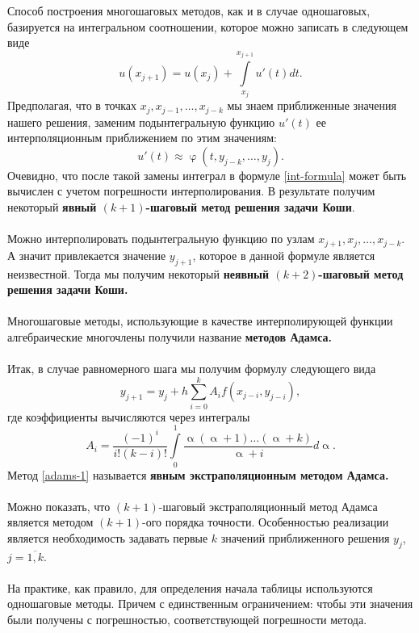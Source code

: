 \documentclass[a4paper, 12pt]{report}
\numberwithin{equation}{section}
\renewcommand{\alpha}{\upalpha}
\renewcommand{\varphi}{\upvarphi}
\begin{document}
	Способ построения многошаговых методов, как и в случае одношаговых, базируется на интегральном соотношении, которое можно записать в следующем виде 
	\begin{equation}
		\label{int-formula}
		u(x_{j+1}) = u(x_j)  + \int\limits_{x_j}^{x_{j+1}} u'(t)dt.
	\end{equation}
	Предполагая, что в точках $x_j, x_{j-1},\ldots, x_{j-k}$ мы знаем приближенные значения нашего решения, заменим подынтегральную функцию $u'(t)$ ее интерполяционным приближением по этим значениям:
	$$u'(t) \approx \varphi(t, y_{j-k}, \ldots, y_j).$$
	Очевидно, что после такой замены интеграл в формуле \eqref{int-formula} может быть вычислен с учетом погрешности интерполирования. В результате получим некоторый \textbf{явный $(k+1)$-шаговый метод решения задачи Коши}.\\\\
	Можно интерполировать подынтегральную функцию по узлам $x_{j+1}, x_j,\ldots, x_{j-k}$. А значит привлекается значение $y_{j+1}$, которое в данной формуле является неизвестной. Тогда мы получим некоторый \textbf{неявный $(k+2)$-шаговый метод решения задачи Коши.} \\\\
	Многошаговые методы, использующие в качестве интерполирующей функции алгебраические многочлены получили название \textbf{методов Адамса.}\\\\
	Итак, в случае равномерного шага мы получим формулу следующего вида \begin{equation}
		\label{adams-1}
		y_{j+1} = y_j + h\sum_{i=0}^{k}A_i f(x_{j-i}, y_{j-i}),
	\end{equation}
	где коэффициенты вычисляются через интегралы $$A_i = \dfrac{(-1)^i}{i! (k-i)!}\int\limits_0^1 \dfrac{\alpha(\alpha+1)\ldots (\alpha+k)}{\alpha+i}d\alpha.$$
	Метод \eqref{adams-1} называется \textbf{явным экстраполяционным методом Адамса.}\\\\
	Можно показать, что $(k+1)$-шаговый экстраполяционный метод Адамса является методом $(k+1)$-ого порядка точности.
	Особенностью реализации является необходимость задавать первые $k$ значений приближенного решения $y_j$, $j=\overline{1,k}$.\\\\
	На практике, как правило, для определения начала таблицы используются одношаговые методы. Причем с единственным ограничением: чтобы эти значения были получены с погрешностью, соответствующей погрешности метода. \\\\
\end{document}
